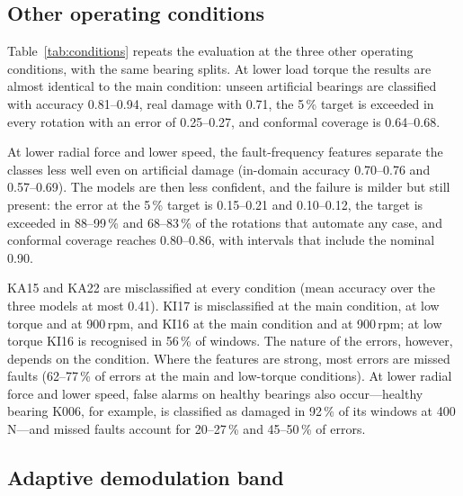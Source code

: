 

\subsection{Other operating conditions}
\label{sec:conditions}

Table~\ref{tab:conditions} repeats the evaluation at the three other operating conditions, with the same bearing
splits. At lower load torque the results are almost identical to the main condition: unseen artificial bearings are
classified with accuracy 0.81--0.94, real damage with 0.71, the 5\,\% target is exceeded in every rotation with
an error of 0.25--0.27, and conformal coverage is 0.64--0.68.

At lower radial force and lower speed, the fault-frequency features separate the classes less well even on artificial
damage (in-domain accuracy 0.70--0.76 and 0.57--0.69). The models are then less confident, and the failure is milder
but still present: the error at the 5\,\% target is 0.15--0.21 and 0.10--0.12, the target is exceeded in 88--99\,\% and
68--83\,\% of the rotations that automate any case, and conformal coverage reaches 0.80--0.86, with intervals that include the nominal 0.90.

KA15 and KA22 are misclassified at every condition (mean accuracy over the three models at most 0.41). KI17 is
misclassified at the main condition, at low torque and at 900\,rpm, and KI16 at the main condition and at 900\,rpm;
at low torque KI16 is recognised in 56\,\% of windows. The nature of the errors,
however, depends on the condition. Where the features are strong, most errors are missed faults (62--77\,\% of
errors at the main and low-torque conditions). At lower radial force and lower speed, false alarms on healthy bearings
also occur---healthy bearing K006, for example, is classified as damaged in 92\,\% of its windows at 400\,N---and missed
faults account for 20--27\,\% and 45--50\,\% of errors.




\subsection{Adaptive demodulation band}
\label{sec:adaptive}


